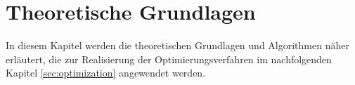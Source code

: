 \chapter{Theoretische Grundlagen} \label{sec:algorithms}

In diesem Kapitel werden die theoretischen Grundlagen und Algorithmen näher erläutert, die zur Realisierung der Optimierungsverfahren im nachfolgenden Kapitel \ref{sec:optimization} angewendet werden. 










